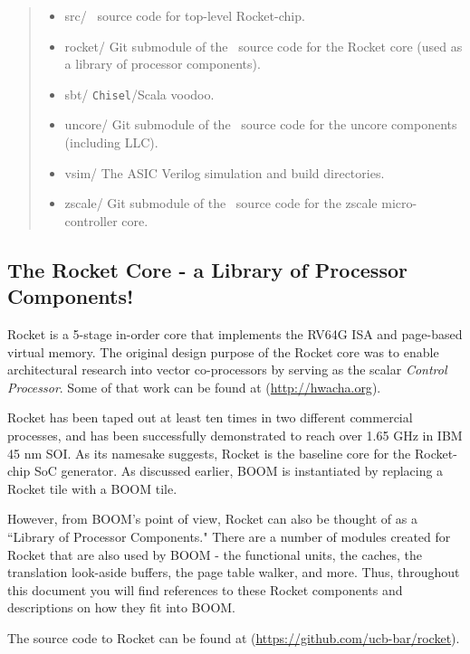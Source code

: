 \begin{quote}
\begin{itemize}
\begin{itemize}
  \item src/ {\footnotesize \color{red} \Chisel\ source code for top-level Rocket-chip.}
  \item rocket/ {\footnotesize \color{red} Git submodule of the \Chisel\ source code for the Rocket core (used as a library of processor components).}
      \item sbt/ {\footnotesize \color{red} {\tt Chisel}/Scala voodoo.}
  \item uncore/ {\footnotesize \color{red} Git submodule of the \Chisel\ source code for the uncore components (including LLC).}
    \item vsim/ {\footnotesize \color{red} The ASIC Verilog simulation and build directories. }
    \item zscale/ {\footnotesize \color{red} Git submodule of the \Chisel\ source code for the zscale micro-controller core. }
   
\end{itemize}
\end{itemize}
\end{quote}

\subsection{The Rocket Core - a Library of Processor Components!}

Rocket is a 5-stage in-order core that implements the RV64G ISA and page-based virtual memory.  The original design purpose of the Rocket core was to enable architectural research into vector co-processors by serving as the scalar {\em Control Processor}.  Some of that work can be found at (\url{http://hwacha.org}). 

Rocket has been taped out at least ten times in two different commercial processes, and has been successfully demonstrated to reach over 1.65 GHz in IBM 45 nm SOI.\cite{riscv_nature} As its namesake suggests, Rocket is the baseline core for the Rocket-chip SoC generator. As discussed earlier, BOOM is instantiated by replacing a Rocket tile with a BOOM tile. 

However, from BOOM's point of view, Rocket can also be thought of as a ``Library of Processor Components."  There are a number of modules created for Rocket that are also used by BOOM - the functional units, the caches, the translation look-aside buffers, the page table walker, and more.  Thus, throughout this document you will find references to these Rocket components and descriptions on how they fit into BOOM.

The source code to Rocket can be found at (\url{https://github.com/ucb-bar/rocket}).  
